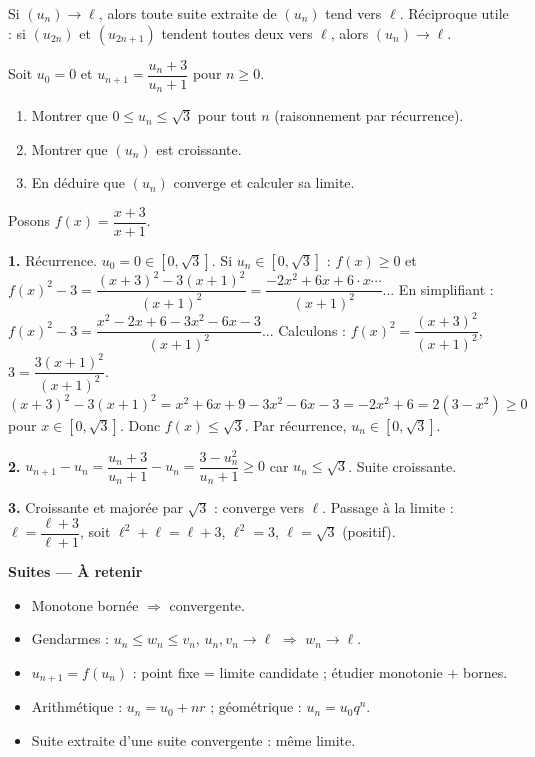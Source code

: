\documentclass[11pt,a4paper,twoside]{book}
\begin{document}
\begin{theoremebox}
Si $(u_n) \to \ell$, alors toute suite extraite de $(u_n)$ tend vers $\ell$.
Réciproque utile : si $(u_{2n})$ et $(u_{2n+1})$ tendent toutes deux vers $\ell$, alors $(u_n) \to \ell$.
\end{theoremebox}

\begin{exercicebox}
Soit $u_0 = 0$ et $u_{n+1} = \dfrac{u_n + 3}{u_n + 1}$ pour $n \geq 0$.
\begin{enumerate}
  \item Montrer que $0 \leq u_n \leq \sqrt{3}$ pour tout $n$ (raisonnement par récurrence).
  \item Montrer que $(u_n)$ est croissante.
  \item En déduire que $(u_n)$ converge et calculer sa limite.
\end{enumerate}
\end{exercicebox}

\begin{correctionbox}[Correction]
Posons $f(x) = \dfrac{x+3}{x+1}$.

\textbf{1.} Récurrence. $u_0=0\in[0,\sqrt{3}]$. Si $u_n\in[0,\sqrt{3}]$ : $f(x)\geq 0$ et $f(x)^2-3 = \dfrac{(x+3)^2-3(x+1)^2}{(x+1)^2} = \dfrac{-2x^2+6x+6\cdot x\cdots}{(x+1)^2}$... En simplifiant : $f(x)^2-3 = \dfrac{x^2-2x+6-3x^2-6x-3}{(x+1)^2}$... Calculons : $f(x)^2 = \dfrac{(x+3)^2}{(x+1)^2}$, $3 = \dfrac{3(x+1)^2}{(x+1)^2}$. $(x+3)^2-3(x+1)^2 = x^2+6x+9-3x^2-6x-3 = -2x^2+6 = 2(3-x^2) \geq 0$ pour $x\in[0,\sqrt{3}]$. Donc $f(x)\leq\sqrt{3}$. Par récurrence, $u_n\in[0,\sqrt{3}]$.

\textbf{2.} $u_{n+1}-u_n = \dfrac{u_n+3}{u_n+1}-u_n = \dfrac{3-u_n^2}{u_n+1} \geq 0$ car $u_n\leq\sqrt{3}$. Suite croissante.

\textbf{3.} Croissante et majorée par $\sqrt{3}$ : converge vers $\ell$. Passage à la limite : $\ell = \dfrac{\ell+3}{\ell+1}$, soit $\ell^2+\ell=\ell+3$, $\ell^2=3$, $\ell=\sqrt{3}$ (positif).
\end{correctionbox}

\begin{retenirbox}
\textbf{Suites — À retenir}
\begin{itemize}
  \item Monotone bornée $\Rightarrow$ convergente.
  \item Gendarmes : $u_n\leq w_n\leq v_n$, $u_n,v_n\to\ell$ $\Rightarrow$ $w_n\to\ell$.
  \item $u_{n+1}=f(u_n)$ : point fixe = limite candidate ; étudier monotonie + bornes.
  \item Arithmétique : $u_n=u_0+nr$ ; géométrique : $u_n=u_0 q^n$.
  \item Suite extraite d'une suite convergente : même limite.
\end{itemize}
\end{retenirbox}
\end{document}
